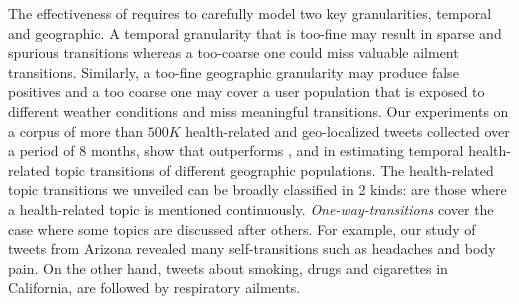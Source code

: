 The effectiveness of \tmatam requires to carefully model two key granularities,
temporal and geographic. A temporal granularity that is too-fine may result in
sparse and spurious transitions whereas a too-coarse one could miss
valuable ailment transitions. Similarly, a too-fine geographic
granularity may produce false positives and a too coarse one may cover
a user population that is exposed to different weather conditions and
miss meaningful transitions. Our experiments on a corpus of more than $500K$ health-related and geo-localized tweets
collected over a period of 8 months, show that \tmatam outperforms \atam,
 \tmlda and \lda in estimating temporal health-related topic transitions of different
geographic populations. The health-related topic transitions we unveiled can be broadly classified in 2 kinds: {\em \selftransitions} are those where a health-related topic
is mentioned continuously. {\em One-way-transitions} cover the case where
some topics are discussed after others.
For example, our study of tweets from Arizona revealed many self-transitions such as
headaches and body pain. On the other hand, tweets about smoking,
drugs and cigarettes in California, are followed by respiratory
ailments.

